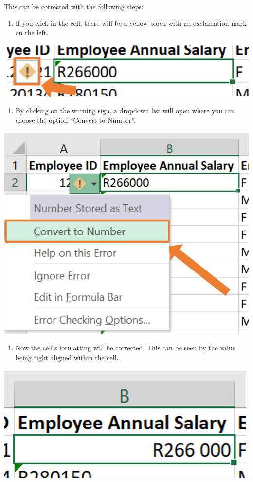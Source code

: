 \documentclass[
]{book}
\providecommand{\tightlist}{%
  \setlength{\itemsep}{0pt}\setlength{\parskip}{0pt}}
\begin{document}
This can be corrected with the following steps:

\begin{enumerate}
\def\labelenumi{\arabic{enumi}.}
\tightlist
\item
  If you click in the cell, there will be a yellow block with an exclamation mark on the left.
\end{enumerate}

\begin{center}\includegraphics[width=0.4\linewidth]{Figures/cleaning_formatting_1} \end{center}

\begin{enumerate}
\def\labelenumi{\arabic{enumi}.}
\setcounter{enumi}{1}
\tightlist
\item
  By clicking on the warning sign, a dropdown list will open where you can choose the option ``Convert to Number''.
\end{enumerate}

\begin{center}\includegraphics[width=0.4\linewidth]{Figures/cleaning_formatting_2} \end{center}

\begin{enumerate}
\def\labelenumi{\arabic{enumi}.}
\setcounter{enumi}{2}
\tightlist
\item
  Now the cell's formatting will be corrected. This can be seen by the value being right aligned within the cell.
\end{enumerate}

\begin{center}\includegraphics[width=0.4\linewidth]{Figures/cleaning_formatting_3} \end{center}
\end{document}
